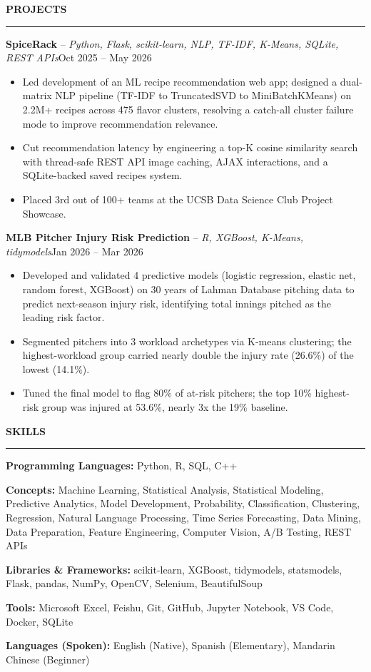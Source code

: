 \documentclass[letterpaper,10pt]{article}
\newcommand{\resumeSection}[1]{%
  \vspace{3pt}%
  {\large\bfseries #1}\par
  \vspace{-4pt}\rule{\linewidth}{0.4pt}\par
  \vspace{1pt}%
}
\newcommand{\projectEntry}[2]{%
  #1\hfill #2\par
}
\newenvironment{bullets}{\begin{itemize}}{\end{itemize}\vspace{1pt}}
\begin{document}
\resumeSection{PROJECTS}
\projectEntry{\textbf{SpiceRack} -- \textit{Python, Flask, scikit-learn, NLP, TF-IDF, K-Means, SQLite, REST APIs}}{Oct 2025 -- May 2026}
\begin{bullets}
  \item Led development of an ML recipe recommendation web app; designed a dual-matrix NLP pipeline (TF-IDF to TruncatedSVD to MiniBatchKMeans) on 2.2M+ recipes across 475 flavor clusters, resolving a catch-all cluster failure mode to improve recommendation relevance.
  \item Cut recommendation latency by engineering a top-K cosine similarity search with thread-safe REST API image caching, AJAX interactions, and a SQLite-backed saved recipes system.
  \item Placed 3rd out of 100+ teams at the UCSB Data Science Club Project Showcase.
\end{bullets}
\projectEntry{\textbf{MLB Pitcher Injury Risk Prediction} -- \textit{R, XGBoost, K-Means, tidymodels}}{Jan 2026 -- Mar 2026}
\begin{bullets}
  \item Developed and validated 4 predictive models (logistic regression, elastic net, random forest, XGBoost) on 30 years of Lahman Database pitching data to predict next-season injury risk, identifying total innings pitched as the leading risk factor.
  \item Segmented pitchers into 3 workload archetypes via K-means clustering; the highest-workload group carried nearly double the injury rate (26.6\%) of the lowest (14.1\%).
  \item Tuned the final model to flag 80\% of at-risk pitchers; the top 10\% highest-risk group was injured at 53.6\%, nearly 3x the 19\% baseline.
\end{bullets}

\resumeSection{SKILLS}
\textbf{Programming Languages:} Python, R, SQL, C++\par
\textbf{Concepts:} Machine Learning, Statistical Analysis, Statistical Modeling, Predictive Analytics, Model Development, Probability, Classification, Clustering, Regression, Natural Language Processing, Time Series Forecasting, Data Mining, Data Preparation, Feature Engineering, Computer Vision, A/B Testing, REST APIs\par
\textbf{Libraries \& Frameworks:} scikit-learn, XGBoost, tidymodels, statsmodels, Flask, pandas, NumPy, OpenCV, Selenium, BeautifulSoup\par
\textbf{Tools:} Microsoft Excel, Feishu, Git, GitHub, Jupyter Notebook, VS Code, Docker, SQLite\par
\textbf{Languages (Spoken):} English (Native), Spanish (Elementary), Mandarin Chinese (Beginner)\par
\end{document}
